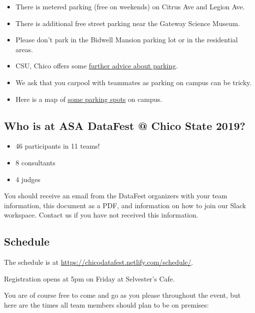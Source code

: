 \documentclass[]{article}
\providecommand{\tightlist}{%
  \setlength{\itemsep}{0pt}\setlength{\parskip}{0pt}}
\begin{document}
\begin{itemize}
\tightlist
\item
  There is metered parking (free on weekends) on Citrus Ave and Legion
  Ave.
\item
  There is additional free street parking near the Gateway Science
  Museum.
\item
  Please don't park in the Bidwell Mansion parking lot or in the
  residential areas.
\item
  CSU, Chico offers some
  \href{https://www.csuchico.edu/parking/wheretopark.shtml}{further
  advice about parking}.
\item
  We ask that you carpool with teammates as parking on campus can be
  tricky.
\item
  Here is a map of
  \href{https://www.csuchico.edu/maps/campus/?id=1193\#!ce/28506,32116,36245?ct/28506,36245,36247,36246,36473,36472,32115,32092?mc/39.72895946407476,-121.8430553376675?z/15?lvl/0}{some
  parking spots} on campus.
\end{itemize}

\hypertarget{who-is-at-asa-datafest-chico-state-2019}{%
\subsection{Who is at ASA DataFest @ Chico State
2019?}\label{who-is-at-asa-datafest-chico-state-2019}}

\begin{itemize}
\tightlist
\item
  46 participants in 11 teams!
\item
  8 consultants
\item
  4 judges
\end{itemize}

You should receive an email from the DataFest organizers with your team
information, this document as a PDF, and information on how to join our
Slack workspace. Contact us if you have not received this information.

\hypertarget{schedule}{%
\subsection{Schedule}\label{schedule}}

The schedule is at \url{https://chicodatafest.netlify.com/schedule/}.

Registration opens at 5pm on Friday at Selvester's Cafe.

You are of course free to come and go as you please throughout the
event, but here are the times all team members should plan to be on
premises:
\end{document}
